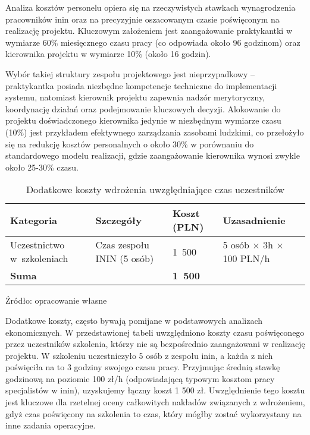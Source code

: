 Analiza kosztów personelu opiera się na rzeczywistych stawkach wynagrodzenia pracowników \gls{inin} oraz na precyzyjnie oszacowanym czasie poświęconym na realizację projektu. Kluczowym założeniem jest zaangażowanie praktykantki w wymiarze 60\% miesięcznego czasu pracy (co odpowiada około 96 godzinom) oraz kierownika projektu w wymiarze 10\% (około 16 godzin).

Wybór takiej struktury zespołu projektowego jest nieprzypadkowy – praktykantka posiada niezbędne kompetencje techniczne do implementacji systemu, natomiast kierownik projektu zapewnia nadzór merytoryczny, koordynację działań oraz podejmowanie kluczowych decyzji. Alokowanie do projektu doświadczonego kierownika jedynie w niezbędnym wymiarze czasu (10\%) jest przykładem efektywnego zarządzania zasobami ludzkimi, co przełożyło się na redukcję kosztów personalnych o około 30\% w porównaniu do standardowego modelu realizacji, gdzie zaangażowanie kierownika wynosi zwykle około 25-30\% czasu.

\begin{table}[ht]
    \centering
    \caption[Dodatkowe koszty wdrożenia uwzględniające czas uczestników, źródło: opracowanie własne]{Dodatkowe koszty wdrożenia uwzględniające czas uczestników}
    \label{tab:dodatkowe_koszty_czas}
    \renewcommand{\arraystretch}{1.3} %
    \begin{tabular}{| p{} | p{} | p{} | p{} |}
        \hline
        \textbf{Kategoria} & \textbf{Szczegóły} & \textbf{Koszt (PLN)} & \textbf{Uzasadnienie} \\
        \hline
        Uczestnictwo w~szkoleniach & Czas zespołu ININ (5 osób) & 1~500 & 5 osób $\times$ 3h $\times$ 100 PLN/h \\
        \hline
        \textbf{Suma} & & \textbf{1~500} & \\
        \hline
    \end{tabular}
    \vspace{0.5em}
    \par\raggedright\footnotesize{Źródło: opracowanie własne}
\end{table}

Dodatkowe koszty, często bywają pomijane w podstawowych analizach ekonomicznych. W przedstawionej tabeli uwzględniono koszty czasu poświęconego przez uczestników szkolenia, którzy nie są bezpośrednio zaangażowani w realizację projektu.
W szkoleniu uczestniczyło 5 osób z zespołu \gls{inin}, a każda z nich poświęciła na to 3 godziny swojego czasu pracy. Przyjmując średnią stawkę godzinową na poziomie 100 zł/h (odpowiadającą typowym kosztom pracy specjalistów w \gls{inin}), uzyskujemy łączny koszt 1 500 zł. Uwzględnienie tego kosztu jest kluczowe dla rzetelnej oceny całkowitych nakładów związanych z wdrożeniem, gdyż czas poświęcony na szkolenia to czas, który mógłby zostać wykorzystany na inne zadania operacyjne.

